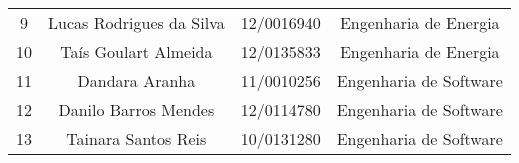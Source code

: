 \begin{resumo}
\begin{table}[h]
{\begin{tabular}{ l l l l }
  \\  
  \cline{1-1}\cline{2-2}\cline{3-3}\cline{4-4}  
    \multicolumn{1}{|c|}{9} &
    \multicolumn{1}{c|}{Lucas Rodrigues da Silva} &
    \multicolumn{1}{c|}{12/0016940   } &
    \multicolumn{1}{c|}{Engenharia de Energia}
  \\  
  \cline{1-1}\cline{2-2}\cline{3-3}\cline{4-4}  
    \multicolumn{1}{|c|}{10} &
    \multicolumn{1}{c|}{Taís Goulart Almeida} &
    \multicolumn{1}{c|}{12/0135833} &
    \multicolumn{1}{c|}{Engenharia de Energia}
  \\  
  \cline{1-1}\cline{2-2}\cline{3-3}\cline{4-4}  
    \multicolumn{1}{|c|}{11} &
    \multicolumn{1}{c|}{Dandara Aranha} &
    \multicolumn{1}{c|}{11/0010256} &
    \multicolumn{1}{c|}{Engenharia de Software}
  \\  
  \cline{1-1}\cline{2-2}\cline{3-3}\cline{4-4}  
    \multicolumn{1}{|c|}{12} &
    \multicolumn{1}{c|}{Danilo Barros Mendes} &
    \multicolumn{1}{c|}{12/0114780} &
    \multicolumn{1}{c|}{Engenharia de Software}
  \\  
  \cline{1-1}\cline{2-2}\cline{3-3}\cline{4-4}  
    \multicolumn{1}{|c|}{13} &
    \multicolumn{1}{c|}{Tainara Santos Reis} &
    \multicolumn{1}{c|}{10/0131280} &
    \multicolumn{1}{c|}{Engenharia de Software}
  \\  
  \hline

 \end{tabular} }
\end{table}

\newpage

\end{resumo}


